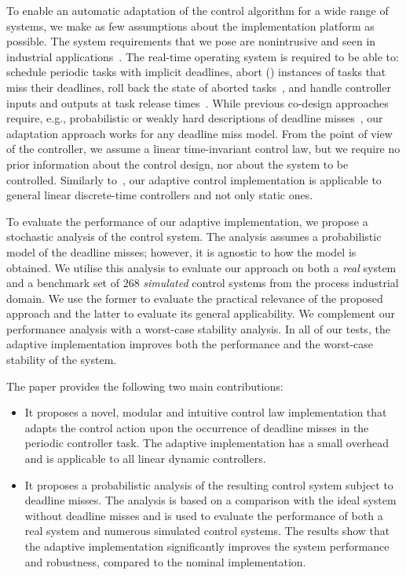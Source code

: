 To enable an automatic adaptation of the control algorithm for a wide range of systems, we make as few assumptions about the implementation platform as possible.
The system requirements that we pose are nonintrusive and seen in industrial applications~\cite{akesson:2020}.
The real-time operating system is required to be able to: schedule periodic tasks with implicit deadlines, abort (\tK{}) instances of tasks that miss their deadlines, roll back the state of aborted tasks~\cite{Zhang:2003,Seong:2001}, and handle controller inputs and outputs at task release times~\cite{Kirsch:2012, Ernst:2018}.
While previous co-design approaches require, e.g., probabilistic or weakly hard descriptions of deadline misses~\cite{Pazzaglia:2019,Chakraborty:2014}, our adaptation approach works for any deadline miss model.
From the point of view of the controller, we assume a linear time-invariant control law, but we require no prior information about the control design, nor about the system to be controlled.
Similarly to~\cite{Pazzaglia:2021}, our adaptive control implementation is applicable to general linear discrete-time controllers and not only static ones.

To evaluate the performance of our adaptive implementation, we propose a stochastic analysis of the control system.
The analysis assumes a probabilistic model of the deadline misses; however, it is agnostic to how the model is obtained.
We utilise this analysis to evaluate our approach on both a \emph{real} system and a benchmark set of $268$ \emph{simulated} control systems from the process industrial domain.
We use the former to evaluate the practical relevance of the proposed approach and the latter to evaluate its general applicability.
We complement our performance analysis with a worst-case stability analysis.
In all of our tests, the adaptive implementation improves both the performance and the worst-case stability of the system.

The paper provides the following two main contributions:
\begin{itemize}
    \item It proposes a novel, modular and intuitive control law implementation that adapts the control action upon the occurrence of deadline misses in the periodic controller task. The adaptive implementation has a small overhead and is applicable to all linear dynamic controllers.
    \item It proposes a probabilistic analysis of the resulting control system subject to deadline misses.
    The analysis is based on a comparison with the ideal system without deadline misses and is used to evaluate the performance of both a real system and numerous simulated control systems.
    The results show that the adaptive implementation significantly improves the system performance and robustness, compared to the nominal implementation.
\end{itemize}

